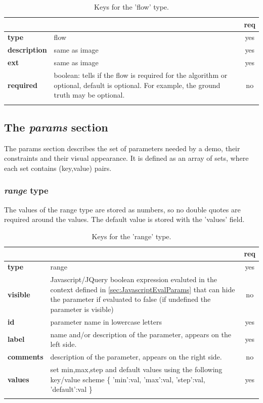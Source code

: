 \begin{longtable}{|>{\bf}L{\linewidth}|L{\linewidth}|c|}
\hline
{}     &  & {\bf req} \tabularnewline 
\hline \hline
 type             & flow & yes \\ \hline
 description      & same as image & yes \\ \hline
 ext              & same as image & yes \\ \hline
 required         & boolean: tells if the flow is required for the algorithm
or optional, default is optional. For example, the ground truth may be optional.& no \\ \hline
\caption{Keys for the 'flow' type.}
\end{longtable}


\subsection{The \emph{params} section}
The params section describes the set of parameters needed by a demo, their 
constraints and their visual appearance. It is defined as an array of sets, 
where each set contains (key,value) pairs.


\subsubsection{ \emph{range} type}

The values of the range type are stored as numbers, so no double quotes are 
required around the values. The default value is stored with the 'values' field.

\begin{longtable}{|>{\bf}L{\linewidth}|L{\linewidth}|c|}
\hline
      &  & {\bf req} 
\tabularnewline \hline \hline
 type  & range       & yes \\ \hline
 visible  & Javascript/JQuery boolean expression evaluted in the context defined 
              in \ref{sec:JavascriptEvalParams} that can hide the parameter if
            evaluated to false (if undefined the parameter is visible)& no \\ \hline
 id     & parameter name in lowercase letters  & yes \\ \hline
 label  & name and/or description of the parameter, appears on the left side. & yes
                      \\ \hline
 comments & description of the parameter, appears on the right side. & no
                      \\ \hline
 values & set min,max,step and default values using the following key/value 
scheme \{ 'min':val, 'max':val, 'step':val, 'default':val \} & yes
                      \\ \hline
\caption{Keys for the 'range' type.}
\end{longtable}

